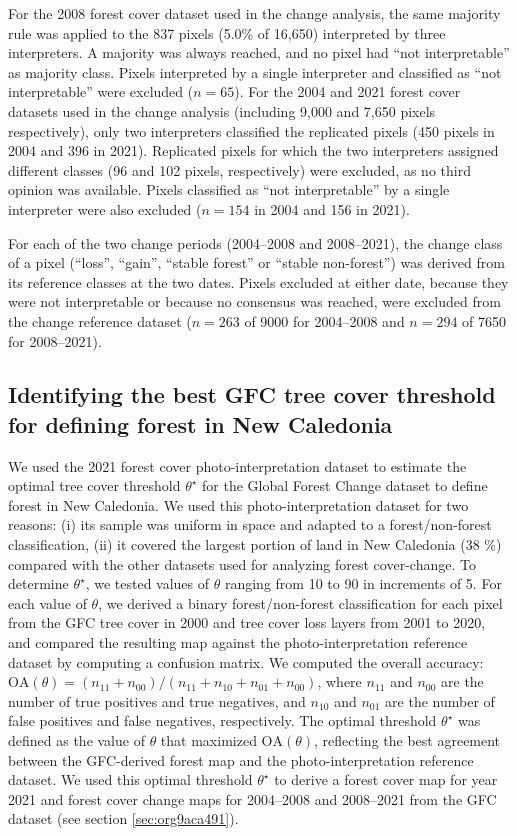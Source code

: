 \documentclass[paper=a4, fontsize=12pt, DIV=13, english, dvipsnames]{scrartcl}
\begin{document}
For the 2008 forest cover dataset used in the change analysis, the same majority rule was applied to the 837 pixels (5.0\% of 16,650) interpreted by three interpreters. A majority was always reached, and no pixel had ``not interpretable'' as majority class. Pixels interpreted by a single interpreter and classified as ``not interpretable'' were excluded (\(n = 65\)). For the 2004 and 2021 forest cover datasets used in the change analysis (including 9,000 and 7,650 pixels respectively), only two interpreters classified the replicated pixels (450 pixels in 2004 and 396 in 2021). Replicated pixels for which the two interpreters assigned different classes (96 and 102 pixels, respectively) were excluded, as no third opinion was available. Pixels classified as ``not interpretable'' by a single interpreter were also excluded (\(n = 154\) in 2004 and 156 in 2021).

For each of the two change periods (2004--2008 and 2008--2021), the change class of a pixel (``loss'', ``gain'', ``stable forest'' or ``stable non-forest'') was derived from its reference classes at the two dates. Pixels excluded at either date, because they were not interpretable or because no consensus was reached, were excluded from the change reference dataset (\(n = 263\) of 9000 for 2004--2008 and \(n = 294\) of 7650 for 2008--2021).
\subsection{Identifying the best GFC tree cover threshold for defining forest in New Caledonia}
\label{sec:org3145330}
We used the 2021 forest cover photo-interpretation dataset to estimate the optimal tree cover threshold \(\theta^{\star}\) for the Global Forest Change dataset to define forest in New Caledonia. We used this photo-interpretation dataset for two reasons: (i) its sample was uniform in space and adapted to a forest/non-forest classification, (ii) it covered the largest portion of land in New Caledonia (38 \%) compared with the other datasets used for analyzing forest cover-change. To determine \(\theta^{\star}\), we tested values of \(\theta\) ranging from 10 to 90 in increments of 5. For each value of \(\theta\), we derived a binary forest/non-forest classification for each pixel from the GFC tree cover in 2000 and tree cover loss layers from 2001 to 2020, and compared the resulting map against the photo-interpretation reference dataset by computing a confusion matrix. We computed the overall accuracy: \(\text{OA}(\theta) = (n_{11} + n_{00}) / (n_{11} + n_{10} + n_{01} + n_{00})\), where \(n_{11}\) and \(n_{00}\) are the number of true positives and true negatives, and \(n_{10}\) and \(n_{01}\) are the number of false positives and false negatives, respectively. The optimal threshold \(\theta^{\star}\) was defined as the value of \(\theta\) that maximized \(\text{OA}(\theta)\), reflecting the best agreement between the GFC-derived forest map and the photo-interpretation reference dataset. We used this optimal threshold \(\theta^{\star}\) to derive a forest cover map for year 2021 and forest cover change maps for 2004--2008 and 2008--2021 from the GFC dataset (see section \ref{sec:org9aca491}).
\end{document}
